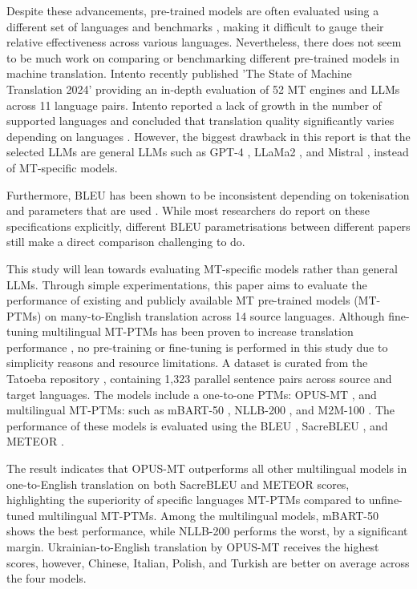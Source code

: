 \documentclass[a4paper, 11pt]{article}
\begin{document}
Despite these advancements, pre-trained models are often evaluated using a different set of languages and benchmarks \cite{liu-2020-mbart,nllb200-2020,fan-2020-m2m100,wei-2023-polylm}, making it difficult to gauge their relative effectiveness across various languages. Nevertheless, there does not seem to be much work on comparing or benchmarking different pre-trained models in machine translation. Intento recently published 'The State of Machine Translation 2024' \cite{intento-2020} providing an in-depth evaluation of 52 MT engines and LLMs across 11 language pairs. Intento reported a lack of growth in the number of supported languages and concluded that translation quality significantly varies depending on languages \cite{intento-2020}. However, the biggest drawback in this report is that the selected LLMs are general LLMs such as GPT-4 \cite{openai-2024-gpt4}, LLaMa2 \cite{touvron-2023-llama2}, and Mistral \cite{jiang-2023-mistral-7b}, instead of MT-specific models.

Furthermore, BLEU \cite{papieni-2002-bleu} has been shown to be inconsistent depending on tokenisation and parameters that are used \cite{post-2018-sacrebleu}. While most researchers do report on these specifications explicitly, different BLEU parametrisations between different papers still make a direct comparison challenging to do.

This study will lean towards evaluating MT-specific models rather than general LLMs. Through simple experimentations, this paper aims to evaluate the performance of existing and publicly available MT pre-trained models (MT-PTMs) on many-to-English translation across 14 source languages. Although fine-tuning multilingual MT-PTMs has been proven to increase translation performance \cite{cooper-stickland-2021-recipes}, no pre-training or fine-tuning is performed in this study due to simplicity reasons and resource limitations. A dataset is curated from the Tatoeba repository \cite{tatoeba}, containing 1,323 parallel sentence pairs across source and target languages. The models include a one-to-one PTMs: OPUS-MT \cite{tiedemann-2023-democratizing,tiedemann-2020-opus-mt}, and multilingual MT-PTMs: such as mBART-50 \cite{liu-2020-mbart}, NLLB-200 \cite{nllb200-2020}, and M2M-100 \cite{fan-2020-m2m100}. The performance of these models is evaluated using the BLEU \cite{papieni-2002-bleu}, SacreBLEU \cite{post-2018-sacrebleu}, and METEOR \cite{lavie-2007-meteor}.

The result indicates that OPUS-MT outperforms all other multilingual models in one-to-English translation on both SacreBLEU and METEOR scores, highlighting the superiority of specific languages MT-PTMs compared to unfine-tuned multilingual MT-PTMs. Among the multilingual models, mBART-50 shows the best performance, while NLLB-200 performs the worst, by a significant margin. Ukrainian-to-English translation by OPUS-MT receives the highest scores, however, Chinese, Italian, Polish, and Turkish are better on average across the four models.
\end{document}
